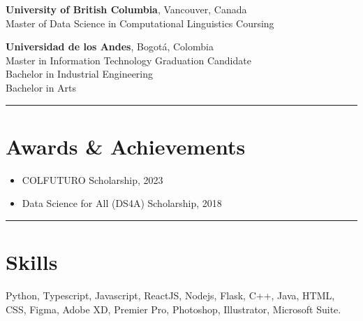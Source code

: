 \documentclass[11pt,a4paper]{article}
\begin{document}
\textbf{University of British Columbia}, Vancouver, Canada \\
Master of Data Science in Computational Linguistics \hfill Coursing

\textbf{Universidad de los Andes}, Bogotá, Colombia \\
Master in Information Technology \hfill Graduation Candidate \\
Bachelor in Industrial Engineering \\
Bachelor in Arts

\rule{\textwidth}{0.4pt} 

\section*{Awards \& Achievements}

\begin{itemize}[noitemsep]
    \item COLFUTURO Scholarship, 2023
    \item Data Science for All (DS4A) Scholarship, 2018
\end{itemize}

\rule{\textwidth}{0.4pt} 
\section*{Skills}

Python, Typescript, Javascript, ReactJS, Nodejs, Flask, C++, Java, HTML, CSS, Figma, Adobe XD, Premier Pro, Photoshop, Illustrator, Microsoft Suite.
\end{document}
